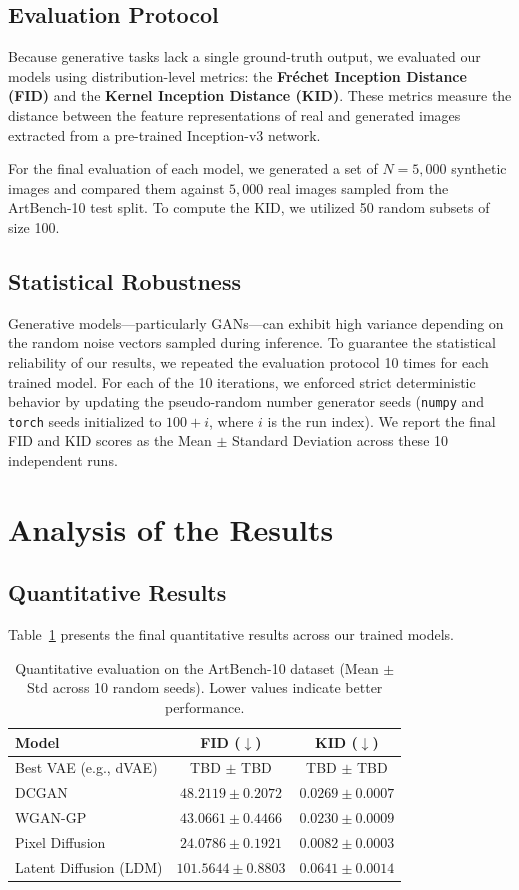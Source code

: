 \documentclass[runningheads]{llncs}
\begin{document}
\subsection{Evaluation Protocol}
Because generative tasks lack a single ground-truth output, we evaluated our models using distribution-level metrics: the \textbf{Fréchet Inception Distance (FID)} and the \textbf{Kernel Inception Distance (KID)}. These metrics measure the distance between the feature representations of real and generated images extracted from a pre-trained Inception-v3 network.

For the final evaluation of each model, we generated a set of $N = 5,000$ synthetic images and compared them against $5,000$ real images sampled from the ArtBench-10 test split. To compute the KID, we utilized 50 random subsets of size 100.

\subsection{Statistical Robustness}
Generative models—particularly GANs—can exhibit high variance depending on the random noise vectors sampled during inference. To guarantee the statistical reliability of our results, we repeated the evaluation protocol 10 times for each trained model. For each of the 10 iterations, we enforced strict deterministic behavior by updating the pseudo-random number generator seeds (\texttt{numpy} and \texttt{torch} seeds initialized to $100 + i$, where $i$ is the run index). We report the final FID and KID scores as the Mean $\pm$ Standard Deviation across these 10 independent runs.


\section{Analysis of the Results}

\subsection{Quantitative Results}
Table~\ref{tab:results} presents the final quantitative results across our trained models. 

\begin{table}[h]
\centering
\caption{Quantitative evaluation on the ArtBench-10 dataset (Mean $\pm$ Std across 10 random seeds). Lower values indicate better performance.}
\label{tab:results}
\begin{tabular}{@{}lcc@{}}
\toprule
\textbf{Model} & \textbf{FID ($\downarrow$)} & \textbf{KID ($\downarrow$)} \\ \midrule
Best VAE (e.g., dVAE) & TBD $\pm$ TBD & TBD $\pm$ TBD \\
DCGAN                 & $48.2119 \pm 0.2072$ & $0.0269 \pm 0.0007$ \\
WGAN-GP               & $43.0661 \pm 0.4466$ & $0.0230 \pm 0.0009$ \\
Pixel Diffusion       & $24.0786 \pm 0.1921$ & $0.0082 \pm 0.0003$ \\
Latent Diffusion (LDM)& $101.5644 \pm 0.8803$ & $0.0641 \pm 0.0014$ \\ \bottomrule
\end{tabular}
\end{table}
\end{document}
